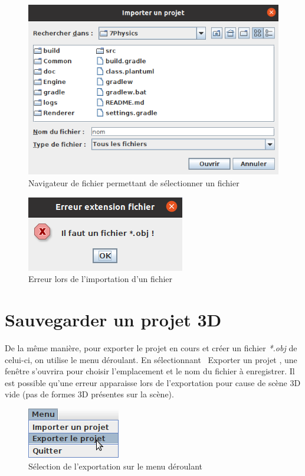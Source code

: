 \documentclass[11pt]{report}
\begin{document}
\begin{figure}[h]
  \centering
  \includegraphics[scale=0.83]{./nav_fichier_imp.png}
  \caption{Navigateur de fichier permettant de sélectionner un fichier}
\end{figure}

\begin{figure}[h]
  \centering
  \includegraphics{./error_imp.png}
  \caption{Erreur lors de l'importation d'un fichier}
\end{figure}


\section{Sauvegarder un projet 3D}

De la même manière, pour exporter le projet en cours et créer un fichier \textit{*.obj} de celui-ci, on utilise le menu déroulant.
En sélectionnant \flqq\ Exporter un projet \frqq, une fenêtre s'ouvrira pour choisir l'emplacement et le nom du fichier à enregistrer.
Il est possible qu'une erreur apparaisse lors de l'exportation pour cause de scène 3D vide (pas de formes 3D présentes sur la scène).

\begin{figure}[h]
  \centering
  \includegraphics{./menu_exp.png}
  \caption{Sélection de l'exportation sur le menu déroulant}
\end{figure}
\end{document}
